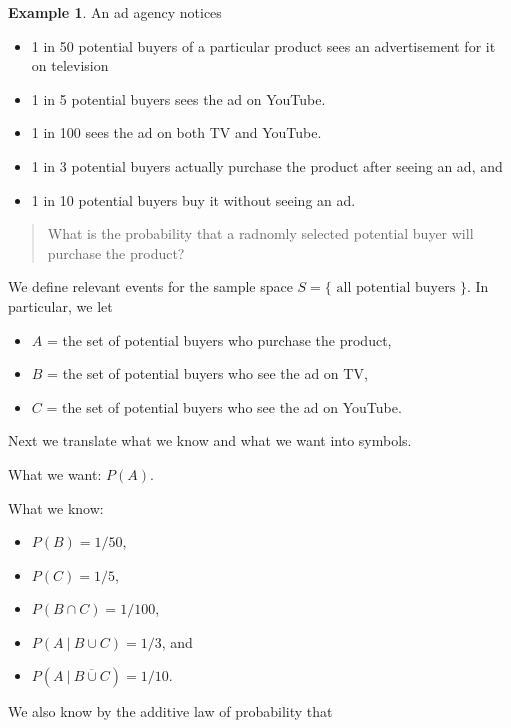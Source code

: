 \documentclass[
]{book}
\providecommand{\tightlist}{%
  \setlength{\itemsep}{0pt}\setlength{\parskip}{0pt}}
\theoremstyle{definition}
\theoremstyle{definition}
\newtheorem{example}{Example}[chapter]
\theoremstyle{definition}
\theoremstyle{definition}
\theoremstyle{remark}
\begin{document}
\begin{example}
\protect\hypertarget{exm:ad-agency}{}\label{exm:ad-agency}An ad agency notices

\begin{itemize}
\tightlist
\item
  1 in 50 potential buyers of a particular product sees an advertisement for it on television
\item
  1 in 5 potential buyers sees the ad on YouTube.
\item
  1 in 100 sees the ad on both TV and YouTube.
\item
  1 in 3 potential buyers actually purchase the product after seeing an ad, and
\item
  1 in 10 potential buyers buy it without seeing an ad.
\end{itemize}

\begin{quote}
What is the probability that a radnomly selected potential buyer will purchase the product?
\end{quote}

We define relevant events for the sample space \(S = \{ \text{ all potential buyers }\}\). In particular, we let

\begin{itemize}
\tightlist
\item
  \(A\) = the set of potential buyers who purchase the product,
\item
  \(B\) = the set of potential buyers who see the ad on TV,
\item
  \(C\) = the set of potential buyers who see the ad on YouTube.
\end{itemize}

Next we translate what we know and what we want into symbols.

What we want: \(P(A)\).

What we know:

\begin{itemize}
\tightlist
\item
  \(P(B) = 1/50\),
\item
  \(P(C) = 1/5\),
\item
  \(P(B \cap C) = 1/100\),
\item
  \(P(A ~|~ B \cup C) = 1/3\), and
\item
  \(P(A ~|~ \overline{B \cup C}) = 1/10.\)
\end{itemize}

We also know by the additive law of probability that


\end{example}
\end{document}
